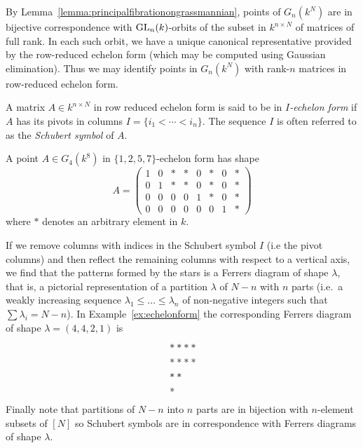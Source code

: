 \documentclass[a4paper,openany]{scrbook}
\begin{document}
\begin{remark}\label{rem:echelonform}
By Lemma~\ref{lemma:principalfibrationongrassmannian}, points of $G_n(k^N)$ are in bijective correspondence with $\operatorname{GL}_n(k)$-orbits of the subset in $k^{n\times N}$ of matrices of full rank. In each  such orbit, we have a unique canonical representative provided by the row-reduced echelon form (which may be computed using Gaussian elimination). 
Thus we may identify points in $G_n(k^N)$ with rank-$n$ matrices in row-reduced echelon form.
\end{remark}

\begin{defn} 
A matrix $A \in k^{n\times N}$ in row reduced echelon form is said to be in \emph{$I$-echelon form} if $A$ has its pivots in columns $I = \{i_1 < \cdots < i_n \}$. 
The sequence $I$ is often referred to as the \emph{Schubert symbol} of $A$.
\end{defn}

\begin{example} \label{ex:echelonform}
A point $A \in G_4(k^{8})$ in $\{ 1,2,5,7\}$-echelon form has shape
\[
A = \begin{pmatrix}
  1 & 0 & * & * & 0 & * & 0 & * \\
  0 & 1 & * & * & 0 & * & 0 & * \\
  0 & 0 & 0 & 0 & 1 & * & 0 & * \\
  0 & 0 & 0 & 0 & 0 & 0 & 1 & *
 \end{pmatrix}
\]
where $*$ denotes an arbitrary element in $k$.  
\end{example} \noindent
\begin{remark}
If we remove columns with indices in the Schubert symbol $I$ (i.e the pivot columns) and then reflect the remaining columns with respect to a vertical axis, we find that the patterns formed by the stars is a Ferrers diagram of shape $\lambda$, that is, a pictorial representation of a partition $\lambda$ of $N-n$ with $n$ parts (i.e.\ a weakly increasing sequence $\lambda_1 \leq \dots \leq \lambda_n$ of non-negative integers such that $\sum \lambda_i = N-n$). In Example~\ref{ex:echelonform} the corresponding Ferrers diagram of shape $\lambda = (4,4,2,1)$ is
\begin{align*}
\displaystyle &**** \\	
	      &**** \\   
	      &**   \\
	      &\hspace{0.08cm} * 
\end{align*} \noindent
Finally note that partitions of $N-n$ into $n$ parts are in bijection with $n$-element subsets of $[N]$ so Schubert symbols are in correspondence with Ferrers diagrams of shape $\lambda$.
\end{remark} 
\end{document}
